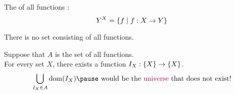 %
%

\begin{frame}{}
  \begin{definition}[$Y^{X}$]
    The  of all functions :
    \[
      Y^{X} = \{f \mid f: X \to Y\}
    \]
  \end{definition}

  \pause
  \begin{center}
  \end{center}

  \pause
  \begin{theorem}
    There is no set consisting of all functions.
  \end{theorem}

  \pause
  \begin{center}
    Suppose  that $A$ is the set of all functions. \\[8pt]

    \pause
    For every set $X$, there exists a function $I_{X}: \{X\} \to \{X\}$.
    \pause
    \[
      \bigcup_{I_{X} \in A} \dom(I_{X})
        \pause\text{ would be the \purple{universe} that does not exist!}
    \]
  \end{center}
\end{frame}
